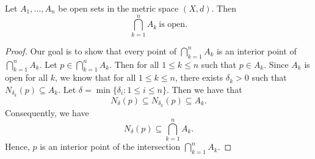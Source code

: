 \documentclass[a4paper]{report}
\begin{document}
\begin{theorem}[ ]
    Let \( {A}_{1}, \dots, {A}_{n} \) be open sets in the metric space \( (X,d) \). Then
    \[  \bigcap_{ k = 1  }^{ n }  {A}_{k} \ \text{is open}. \]
\end{theorem}
\begin{proof}
Our goal is to show that every point of \( \bigcap_{ k = 1  }^{ n  }  {A}_{k } \) is an interior point of \( \bigcap_{ k = 1  }^{ n }  {A}_{k } \). Let \( p \in \bigcap_{  k = 1  }^{ n }  {A}_{k } \). Then for all \(  1 \leq k \leq n  \) such that \( p \in {A}_{k} \). Since \( {A}_{k} \) is open for all \( k  \), we know that for all \( 1 \leq k \leq n   \), there exists \( {\delta}_{k} > 0  \) such that \( {N}_{{\delta}_{k }} (p) \subseteq {A}_{k} \). Let \( \delta = \min \{ {\delta}_{i} : 1 \leq i \leq n   \}  \). Then we have that  
\[  {N}_{\delta}(p) \subseteq  {N}_{{\delta}_{k }}(p) \subseteq  {A}_{k}. \]
Consequently, we have 
\[  {N}_{\delta}(p) \subseteq  \bigcap_{  k = 1 }^{ n }  {A}_{k}. \]
Hence, \( p  \) is an interior point of the intersection \( \bigcap_{  k = 1  }^{ n }  {A}_{k} \).
\end{proof}


\begin{theorem}[ ]
    
\end{theorem}
\end{document}
